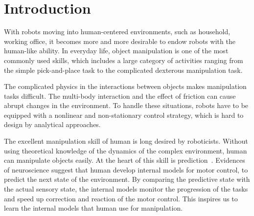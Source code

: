 \section{Introduction}
\label{intro}
With robots moving into human-centered environments, such as household, working office, it becomes more and more desirable to endow robots with the human-like ability. In everyday life, object manipulation is one of the most commonly used skills, which includes a large category of activities ranging from the simple pick-and-place task to the complicated dexterous manipulation task.


The complicated physics in the interactions between objects makes manipulation tasks difficult. The multi-body interaction and the effect of friction can cause abrupt changes in the environment. To handle these situations, robots have to be equipped with a nonlinear and non-stationary control strategy, which is hard to design by analytical approaches.

The excellent manipulation skill of human is long desired by roboticists. Without using theoretical knowledge of the dynamics of the complex environment, human can manipulate objects easily.
At the heart of this skill is prediction~\cite{flanagan2006control}. Evidences of neuroscience suggest that human develop internal models for motor control, to predict the next state of the environment. By comparing the predictive state with the actual sensory state, the internal models monitor the progression of the tasks and speed up correction and reaction of the motor control. This inspires us to learn the internal models that human use for manipulation.

